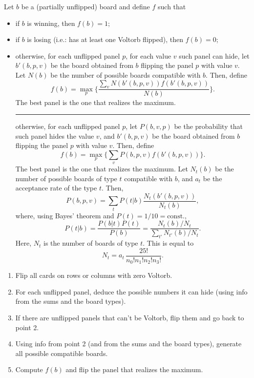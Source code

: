 \documentclass[a4paper,12pt]{article}
\begin{document}
Let $b$ be a (partially unflipped) board and define $f$ such that
\begin{itemize}
\item if $b$ is winning, then $f(b)=1$;
\item if $b$ is losing (i.e.: has at least one Voltorb flipped), then $f(b)=0$;
\item otherwise, for each unflipped panel $p$, for each value $v$ such panel can hide, let $b'(b,p,v)$ be the board obtained from $b$ flipping the panel $p$ with value $v$. Let $N(b)$ be the number of possible boards compatible with $b$. Then, define
\[f(b)=\max_p\biggl\{\frac{\sum_vN(b'(b,p,v))f(b'(b,p,v))}{N(b)}\biggr\}.\]
The best panel is the one that realizes the maximum.

\hrule
otherwise, for each unflipped panel $p$, let $P(b,v,p)$ be the probability that such panel hides the value $v$, and $b'(b,p,v)$ be the board obtained from $b$ flipping the panel $p$ with value $v$. Then, define
\[f(b)=\max_p\biggl\{\sum_vP(b,p,v)f(b'(b,p,v))\biggr\}.\]
The best panel is the one that realizes the maximum. Let $N_t(b)$ be the number of possible boards of type $t$ compatible with $b$, and $a_t$ be the acceptance rate of the type $t$. Then,
\[P(b,p,v)=\sum_tP(t|b)\frac{N_t(b'(b,p,v))}{N_t(b)},\]
where, using Bayes' theorem and $P(t)=1/10=\text{const.}$,
\[P(t|b)=\frac{P(b|t)P(t)}{P(b)}=\frac{N_t(b)/N_t}{\sum_{t'} N_{t'}(b)/N_t}.\]
Here, $N_t$ is the number of boards of type $t$. This is equal to
\[N_t=a_t\,\frac{25!}{n_0!n_1!n_2!n_3!}.\]
\end{itemize}


\begin{enumerate}
\item Flip all cards on rows or columns with zero Voltorb.
\item For each unflipped panel, deduce the possible numbers it can hide (using info from the sums and the board types).
\item If there are unflipped panels that can't be Voltorb, flip them and go back to point 2.
\item Using info from point 2 (and from the sums and the board types), generate all possible compatible boards.
\item Compute $f(b)$ and flip the panel that realizes the maximum.
\end{enumerate}
\end{document}
